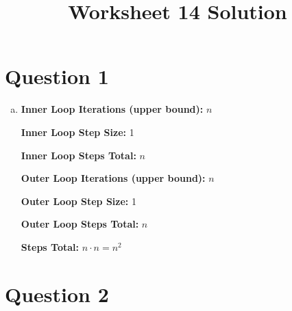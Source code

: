 \documentclass[12pt]{article}
\begin{document}
\title{Worksheet 14 Solution}
\maketitle

\section*{Question 1}
\begin{enumerate}[a.]
    \item

    \textbf{Inner Loop Iterations (upper bound):} $n$

    \textbf{Inner Loop Step Size:} 1

    \textbf{Inner Loop Steps Total:} $n$

    \bigskip

    \textbf{Outer Loop Iterations (upper bound):} $n$

    \textbf{Outer Loop Step Size:} 1

    \textbf{Outer Loop Steps Total:} $n$

    \bigskip

    \textbf{Steps Total:} $n \cdot n = n^2$

\end{enumerate}

\section*{Question 2}
\end{document}
